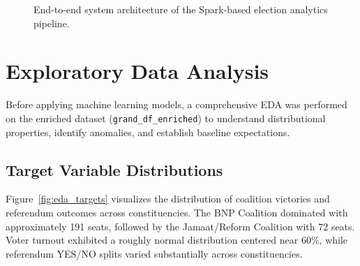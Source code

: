 \documentclass[12pt, a4paper]{article}
\begin{document}
\begin{figure}[H]
\centering
{}
\caption{End-to-end system architecture of the Spark-based election analytics pipeline.}
\label{fig:pipeline}
\end{figure}

\section{Exploratory Data Analysis}

Before applying machine learning models, a comprehensive EDA was performed on the enriched dataset (\texttt{grand\_df\_enriched}) to understand distributional properties, identify anomalies, and establish baseline expectations.

\subsection{Target Variable Distributions}
Figure~\ref{fig:eda_targets} visualizes the distribution of coalition victories and referendum outcomes across constituencies. The BNP Coalition dominated with approximately 191 seats, followed by the Jamaat/Reform Coalition with 72 seats. Voter turnout exhibited a roughly normal distribution centered near 60\%, while referendum YES/NO splits varied substantially across constituencies.
\end{document}
